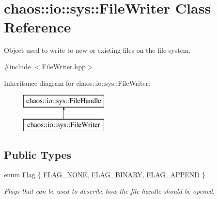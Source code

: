 \hypertarget{classchaos_1_1io_1_1sys_1_1_file_writer}{}\section{chaos\+:\+:io\+:\+:sys\+:\+:File\+Writer Class Reference}
\label{classchaos_1_1io_1_1sys_1_1_file_writer}


Object used to write to new or existing files on the file system.  




{\ttfamily \#include $<$File\+Writer.\+hpp$>$}

Inheritance diagram for chaos\+:\+:io\+:\+:sys\+:\+:File\+Writer\+:\begin{figure}[H]
\begin{center}
\leavevmode
\includegraphics[height=2.000000cm]{classchaos_1_1io_1_1sys_1_1_file_writer}
\end{center}
\end{figure}
\subsection*{Public Types}
\begin{DoxyCompactItemize}
\item 
enum \hyperlink{classchaos_1_1io_1_1sys_1_1_file_writer_aafcaef6dd3171373d8dfadadcc3c1b0b}{Flag} \{ \hyperlink{classchaos_1_1io_1_1sys_1_1_file_writer_aafcaef6dd3171373d8dfadadcc3c1b0bab1c0f867f11da4ed8678148548fa9458}{F\+L\+A\+G\+\_\+\+N\+O\+N\+E}, 
\hyperlink{classchaos_1_1io_1_1sys_1_1_file_writer_aafcaef6dd3171373d8dfadadcc3c1b0baf46420535aaf1e5a6cf757485acaa2bc}{F\+L\+A\+G\+\_\+\+B\+I\+N\+A\+R\+Y}, 
\hyperlink{classchaos_1_1io_1_1sys_1_1_file_writer_aafcaef6dd3171373d8dfadadcc3c1b0ba2e28c6095d07cd49bee60edfcb9c4ec8}{F\+L\+A\+G\+\_\+\+A\+P\+P\+E\+N\+D}
 \}\begin{DoxyCompactList}\small\item\em Flags that can be used to describe how the file handle should be opened. \end{DoxyCompactList}
\end{DoxyCompactItemize}
